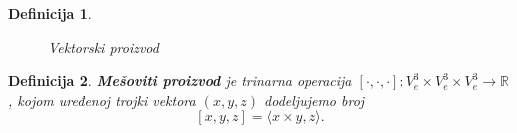 \documentclass[a4paper,12pt,twoside]{report}
\newtheorem{definition}{Definicija}[section]
\numberwithin{algorithm}{section}
\begin{document}
\begin{definition}
\begin{figure}[!h]
    \caption{Vektorski proizvod}
    \label{vektorskiProizvod1}
\end{figure}
\end{definition}




\begin{definition}
    \textbf{Mešoviti proizvod} je trinarna operacija $[\cdot, \cdot, \cdot]:V^3_e \times V^3_e \times V^3_e \to \mathbb{R}$, kojom 
    uređenoj trojki vektora $(x, y, z)$ dodeljujemo broj
     \[[x, y, z] = \langle x \times y, z\rangle.\]
\end{definition}
\end{document}
